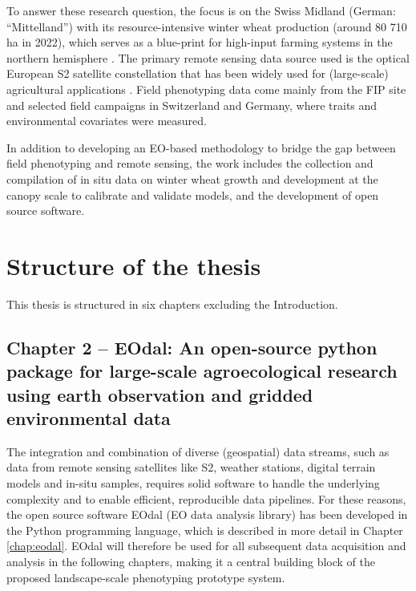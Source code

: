 To answer these research question, the focus is on the Swiss Midland (German: ``Mittelland'') with its resource-intensive winter wheat production (around 80 710 ha in 2022), which serves as a blue-print for high-input farming systems in the northern hemisphere \citep{monfreda_farming_2008}. The primary remote sensing data source used is the optical European \gls{S2} satellite constellation that has been widely used for (large-scale) agricultural applications \citep{frampton_evaluating_2013,  veloso_understanding_2017, clevers_using_2017, perich_pixel-based_2023}. Field phenotyping data come mainly from the FIP site \citep{kirchgessner_eth_2017} and selected field campaigns in Switzerland and Germany, where traits and environmental covariates were measured.

In addition to developing an \gls{EO}-based methodology to bridge the gap between field phenotyping and remote sensing, the work includes the collection and compilation of in situ data on winter wheat growth and development at the canopy scale to calibrate and validate models, and the development of open source software.

\section{Structure of the thesis}

This thesis is structured in six chapters excluding the Introduction.

\subsection*{Chapter 2 -- EOdal: An open-source python package for large-scale agroecological research using earth observation and gridded environmental data}
The integration and combination of diverse (geospatial) data streams, such as data from remote sensing satellites like \gls{S2}, weather stations, digital terrain models and in-situ samples, requires solid software to handle the underlying complexity and to enable efficient, reproducible data pipelines. For these reasons, the open source software EOdal (\gls{EO} data analysis library) has been developed in the Python programming language, which is described in more detail in Chapter \ref{chap:eodal}. EOdal will therefore be used for all subsequent data acquisition and analysis in the following chapters, making it a central building block of the proposed landscape-scale phenotyping prototype system.


